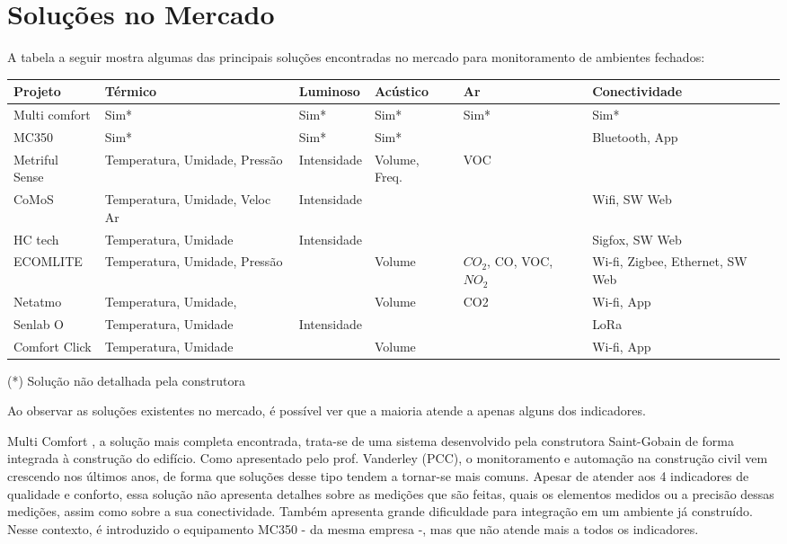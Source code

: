 \documentclass[../monografia.tex]{subfiles}
\begin{document}
\section{Soluções no Mercado} 

A tabela a seguir mostra algumas das principais soluções encontradas no mercado para monitoramento de ambientes fechados: 

\begin{center}
\begin{tabular}{ | m{2.5cm} | m{2.4cm}| m{2.2cm} |m{2cm} |m{2cm} |m{2.8cm} | } 
\hline
\textbf{Projeto} & \textbf{Térmico} & \textbf{Luminoso} & \textbf{Acústico} & \textbf{Ar} & \textbf{Conectividade} \\ 
\hline
Multi comfort \cite{multicomfort} & Sim* & Sim* & Sim* & Sim* & Sim* \\ \hline
MC350\cite{mc350} & Sim* & Sim* & Sim* & & Bluetooth, App \\
\hline
Metriful Sense\cite{metriful} & Temperatura, Umidade, Pressão & Intensidade & Volume, Freq. & VOC &  \\ \hline
CoMoS\cite{CoMoS} & Temperatura, Umidade, Veloc Ar & Intensidade & & & Wifi, SW Web \\ \hline
HC tech\cite{HCTech} & Temperatura, Umidade & Intensidade & & & Sigfox, SW Web \\ \hline
ECOMLITE \cite{ECOMLITE} & Temperatura, Umidade, Pressão & & Volume & $CO_{2}$, CO, VOC, $NO_{2}$ & Wi-fi, Zigbee, Ethernet, SW Web \\ \hline
Netatmo\cite{netatmo} & Temperatura, Umidade, & & Volume & CO2 & Wi-fi, App \\ \hline
Senlab O\cite{Senlab} & Temperatura, Umidade & Intensidade & & & LoRa \\ \hline
Comfort Click\cite{comfortclick} & Temperatura, Umidade & & Volume & & Wi-fi, App  \\ \hline
\end{tabular}
\end{center}

\begin{flushright}
(*) Solução não detalhada pela construtora
\end{flushright}


Ao observar as soluções existentes no mercado, é possível ver que a maioria atende a apenas alguns dos indicadores. 

Multi Comfort \cite{multicomfort}, a solução mais completa encontrada, trata-se de uma sistema desenvolvido pela construtora Saint-Gobain de forma integrada à construção do edifício. Como apresentado pelo prof. Vanderley (PCC), o monitoramento e automação na construção civil vem crescendo nos últimos anos, de forma que soluções desse tipo tendem a tornar-se mais comuns. 
Apesar de atender aos 4 indicadores de qualidade e conforto, essa solução não apresenta detalhes sobre as medições que são feitas, quais os elementos medidos ou a precisão dessas medições, assim como sobre a sua conectividade. Também apresenta grande dificuldade para integração em um ambiente já construído. Nesse contexto, é introduzido o equipamento MC350\cite{mc350} - da mesma empresa -, mas que não atende mais a todos os indicadores. 
\end{document}
